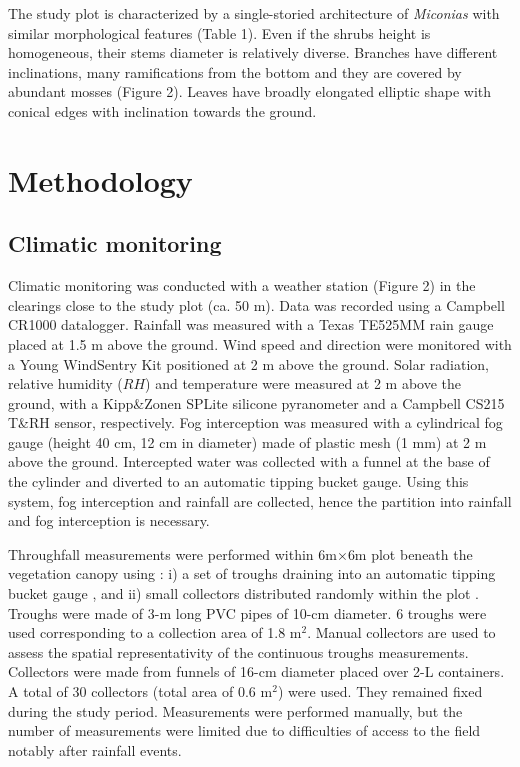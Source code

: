 \documentclass[a4paper,12pt]{article}
\begin{document}
The study plot is characterized by a single-storied architecture of \emph{Miconias} with similar morphological features (Table 1). Even if the shrubs height is homogeneous, their stems diameter is relatively diverse. Branches have different inclinations, many ramifications from the bottom and they are covered by abundant mosses (Figure 2). Leaves have broadly elongated elliptic shape with conical edges with inclination towards the ground.

\section{Methodology}

\subsection{Climatic monitoring} \label{sec:fog_int_moni}
Climatic monitoring was conducted with a weather station (Figure 2) in the clearings close to the study plot (ca. 50 m). Data was recorded using a Campbell CR1000 datalogger. Rainfall was measured with a Texas TE525MM rain gauge placed at 1.5 m above the ground. Wind speed and direction were monitored with a Young WindSentry Kit positioned at 2 m above the ground. Solar radiation, relative humidity ($RH$) and temperature were measured at 2 m above the ground, with a Kipp\&Zonen SPLite silicone pyranometer and a Campbell CS215 T\&RH sensor, respectively. Fog interception was measured with a cylindrical fog gauge (height 40 cm, 12 cm in diameter) made of plastic mesh (1 mm) at 2 m above the ground. Intercepted water was collected with a funnel at the base of the cylinder and diverted to an automatic tipping bucket gauge. Using this system, fog interception and rainfall are collected, hence the partition into rainfall and fog interception is necessary.

Throughfall measurements were performed within 6m$\times$6m plot beneath the vegetation canopy using \citep{Dominguez2016}: i) a set of troughs draining into an automatic tipping bucket gauge \citep{Ziegleretal2009, Zimmermannetal2014}, and ii) small collectors distributed randomly within the plot \citep{Keimetal2005, Staelensetal2006, Zimmermannetal2009}. Troughs were made of 3-m long PVC pipes of 10-cm diameter. 6 troughs were used corresponding to a collection area of 1.8 m$^2$. Manual collectors are used to assess the spatial representativity of the continuous troughs measurements. Collectors were made from funnels of 16-cm diameter placed over 2-L containers. A total of 30 collectors (total area of 0.6 m$^2$) were used. They remained fixed during the study period. Measurements were performed manually, but the number of measurements were limited due to difficulties of access to the field notably after rainfall events. 
\end{document}
